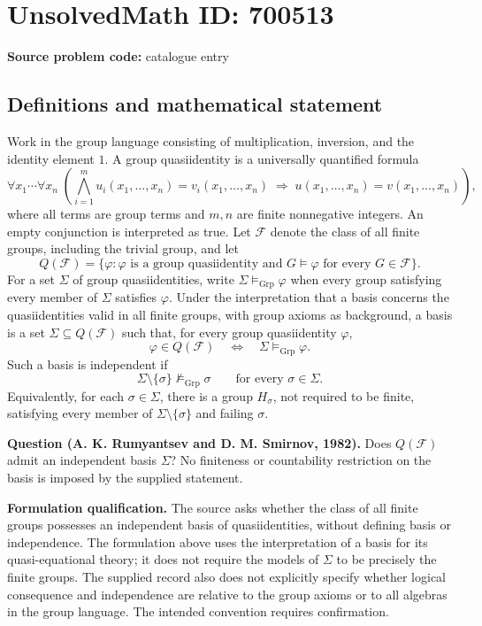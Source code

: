 \documentclass[11pt]{article}
\begin{document}
\section*{UnsolvedMath ID: 700513}
\textbf{Source problem code:} catalogue entry
\subsection{Definitions and mathematical statement}
Work in the group language consisting of multiplication, inversion, and the identity element \(1\). A group quasiidentity is a universally quantified formula
\[
\forall x_1\cdots\forall x_n\;\left(\bigwedge_{i=1}^{m}u_i(x_1,\ldots,x_n)=v_i(x_1,\ldots,x_n)\;\Longrightarrow\;u(x_1,\ldots,x_n)=v(x_1,\ldots,x_n)\right),
\]
where all terms are group terms and \(m,n\) are finite nonnegative integers. An empty conjunction is interpreted as true. Let \(\mathcal F\) denote the class of all finite groups, including the trivial group, and let
\[
Q(\mathcal F)=\{\varphi:\varphi\text{ is a group quasiidentity and }G\models\varphi\text{ for every }G\in\mathcal F\}.
\]
For a set \(\Sigma\) of group quasiidentities, write \(\Sigma\models_{\mathrm{Grp}}\varphi\) when every group satisfying every member of \(\Sigma\) satisfies \(\varphi\). Under the interpretation that a basis concerns the quasiidentities valid in all finite groups, with group axioms as background, a basis is a set \(\Sigma\subseteq Q(\mathcal F)\) such that, for every group quasiidentity \(\varphi\),
\[
\varphi\in Q(\mathcal F)\quad\Longleftrightarrow\quad\Sigma\models_{\mathrm{Grp}}\varphi.
\]
Such a basis is independent if
\[
\Sigma\setminus\{\sigma\}\not\models_{\mathrm{Grp}}\sigma
\qquad\text{for every }\sigma\in\Sigma.
\]
Equivalently, for each \(\sigma\in\Sigma\), there is a group \(H_\sigma\), not required to be finite, satisfying every member of \(\Sigma\setminus\{\sigma\}\) and failing \(\sigma\).

\textbf{Question (A. K. Rumyantsev and D. M. Smirnov, 1982).} Does \(Q(\mathcal F)\) admit an independent basis \(\Sigma\)? No finiteness or countability restriction on the basis is imposed by the supplied statement.

\textbf{Formulation qualification.} The source asks whether the class of all finite groups possesses an independent basis of quasiidentities, without defining basis or independence. The formulation above uses the interpretation of a basis for its quasi-equational theory; it does not require the models of \(\Sigma\) to be precisely the finite groups. The supplied record also does not explicitly specify whether logical consequence and independence are relative to the group axioms or to all algebras in the group language. The intended convention requires confirmation.
\end{document}

